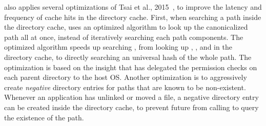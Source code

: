 \thelibos{} also applies several optimizations of Tsai et al., 2015~\cite{tsai15dcache}, to improve the latency and frequency of cache hits
in the directory cache.
First, when searching a path inside the directory cache,
\thelibos{} uses an optimized algorithm to look up the canonicalized path all at once,
instead of iteratively searching each path components.
The optimized algorithm speeds up searching ,
from looking up
, , and  in the directory cache,
to directly searching
an universal hash of the whole path.
The optimization is based on the insight that \thelibos{}
has delegated the permission checks on each parent directory to the host OS.
Another optimization
is to aggressively create {\em negative} directory entries
for paths that are known to be non-existent.
Whenever an application has unlinked or moved a file,
a negative directory entry can be created inside the directory cache, to prevent future \linuxapis{} from calling  to query the existence of the path.





